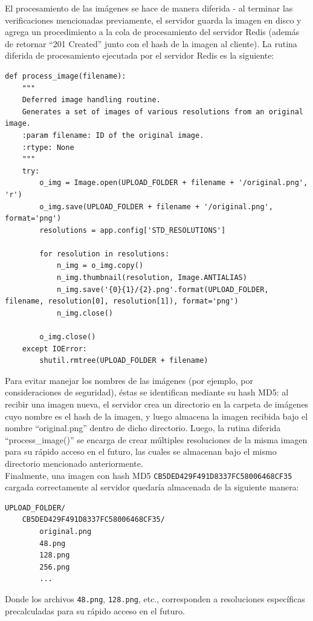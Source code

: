 \documentclass[11pt,letterpaper]{article}
\begin{document}
El procesamiento de las imágenes se hace de manera diferida - al terminar las verificaciones mencionadas previamente, el servidor guarda la imagen en disco y agrega un procedimiento a la cola de procesamiento del servidor Redis (además de retornar ``201 Created'' junto con el hash de la imagen al cliente). La rutina diferida de procesamiento ejecutada por el servidor Redis es la siguiente:

\begin{lstlisting}
def process_image(filename):
    """
    Deferred image handling routine.
    Generates a set of images of various resolutions from an original image.
    :param filename: ID of the original image.
    :rtype: None
    """
    try:
        o_img = Image.open(UPLOAD_FOLDER + filename + '/original.png', 'r')
        o_img.save(UPLOAD_FOLDER + filename + '/original.png', format='png')
        resolutions = app.config['STD_RESOLUTIONS']

        for resolution in resolutions:
            n_img = o_img.copy()
            n_img.thumbnail(resolution, Image.ANTIALIAS)
            n_img.save('{0}{1}/{2}.png'.format(UPLOAD_FOLDER, filename, resolution[0], resolution[1]), format='png')
            n_img.close()

        o_img.close()
    except IOError:
        shutil.rmtree(UPLOAD_FOLDER + filename)
\end{lstlisting}

Para evitar manejar los nombres de las imágenes (por ejemplo, por consideraciones de seguridad), éstas se identifican mediante su hash MD5: al recibir una imagen nueva, el servidor crea un directorio en la carpeta de imágenes cuyo nombre es el hash de la imagen, y luego almacena la imagen recibida bajo el nombre ``original.png'' dentro de dicho directorio. Luego, la rutina diferida ``process\_image()'' se encarga de crear múltiples resoluciones de la misma imagen para su rápido acceso en el futuro, las cuales se almacenan bajo el mismo directorio mencionado anteriormente.\\

Finalmente, una imagen con hash MD5 \texttt{CB5DED429F491D8337FC58006468CF35} cargada correctamente al servidor quedaría almacenada de la siguiente manera:
\begin{verbatim}
UPLOAD_FOLDER/
    CB5DED429F491D8337FC58006468CF35/
        original.png
        48.png
        128.png
        256.png
        ...
\end{verbatim}

Donde los archivos \texttt{48.png}, \texttt{128.png}, etc., corresponden a resoluciones específicas precalculadas para su rápido acceso en el futuro.
\end{document}
